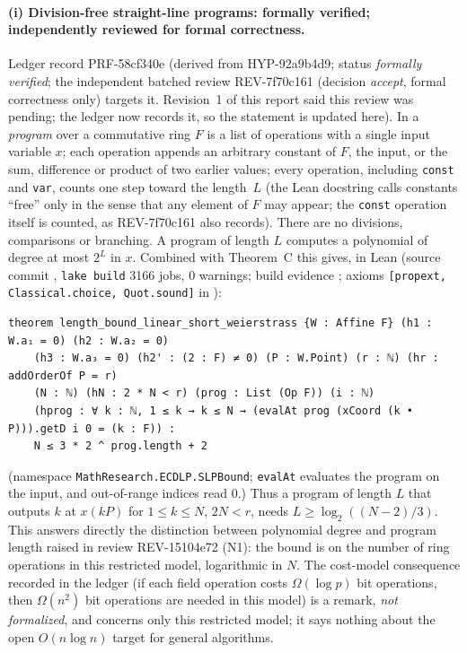 \documentclass[11pt,a4paper]{article}
\theoremstyle{remark}
\begin{document}
\paragraph{(i) Division-free straight-line programs: formally verified; independently reviewed for formal correctness.}
Ledger record \mbox{PRF-58cf340e} (derived from \mbox{HYP-92a9b4d9}; status \emph{formally verified}; the independent batched review \mbox{REV-7f70c161} (decision \emph{accept}, formal correctness only) targets it. Revision~1 of this report said this review was pending; the ledger now records it, so the statement is updated here).
In  a \emph{program} over a commutative ring $F$ is a list of operations with a single input variable
$x$; each operation appends an arbitrary constant of $F$, the input, or the sum, difference or product of two earlier values; every operation, including \texttt{const} and \texttt{var}, counts one step toward the length~$L$ (the Lean docstring calls constants ``free'' only in the sense that any element of $F$ may appear; the \texttt{const} operation itself is counted, as \mbox{REV-7f70c161} also records).
There are no divisions, comparisons or branching. A program of length $L$ computes a polynomial of degree at most $2^L$ in $x$.
Combined with Theorem~C this gives, in Lean (source commit , \texttt{lake build} 3166 jobs, 0 warnings;
build evidence ;
axioms \texttt{[propext, Classical.choice, Quot.sound]} in ):
\begin{lstlisting}
theorem length_bound_linear_short_weierstrass {W : Affine F} (h1 : W.a₁ = 0) (h2 : W.a₂ = 0)
    (h3 : W.a₃ = 0) (h2' : (2 : F) ≠ 0) (P : W.Point) (r : ℕ) (hr : addOrderOf P = r)
    (N : ℕ) (hN : 2 * N < r) (prog : List (Op F)) (i : ℕ)
    (hprog : ∀ k : ℕ, 1 ≤ k → k ≤ N → (evalAt prog (xCoord (k • P))).getD i 0 = (k : F)) :
    N ≤ 3 * 2 ^ prog.length + 2
\end{lstlisting}
(namespace \texttt{MathResearch.ECDLP.SLPBound}; \texttt{evalAt} evaluates the program on the input, and out-of-range indices read $0$.)
Thus a program of length $L$ that outputs $k$ at $x(kP)$ for $1\le k\le N$, $2N<r$, needs $L\ge\log_2((N-2)/3)$. This answers directly the
distinction between polynomial degree and program length raised in review \mbox{REV-15104e72} (N1): the bound is on the number of ring operations
in this restricted model, logarithmic in $N$. The cost-model consequence recorded in the ledger (if each field operation costs $\Omega(\log p)$ bit operations,
then $\Omega(n^2)$ bit operations are needed in this model) is a remark, \emph{not formalized}, and concerns only this restricted model; it says nothing about the open
$O(n\log n)$ target for general algorithms.
\end{document}
